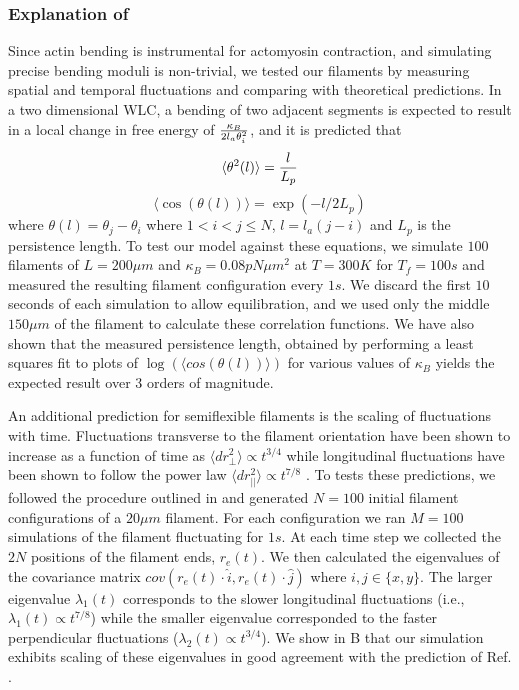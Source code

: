 \documentclass[12pt]{article}
\begin{document}
\subsubsection{Explanation of }
Since actin bending is instrumental for actomyosin contraction, and simulating
precise bending moduli is non-trivial, we tested our filaments by measuring 
spatial and temporal fluctuations and comparing with theoretical predictions.
In a two dimensional WLC, a bending of two adjacent segments is expected to
result in a local change in free energy of ${\kappa_B\over2l_a\theta_i^2}$, and
it is predicted that \cite{frontali1979}
\begin{equation}
  \langle\theta^2(l)\rangle = {l\over L_p}
  \label{eqn:thsq}
\end{equation}
\begin{equation} 
  \langle\cos(\theta(l))\rangle = \exp{(-l/2L_p)}
  \label{eqn:costh}
\end{equation} 
where $\theta(l) = \theta_j - \theta_i$ where $1<i<j\le N$, $l = l_a(j-i)$ and
$L_p$ is the persistence length. To test our model against these equations, we
simulate $100$ filaments of $L=200\mu m$ and $\kappa_B=0.08 pN\mu m^2$ at
$T=300K$ for $T_f = 100s$ and measured the resulting filament configuration
every $1s$. We discard the first $10$ seconds of each simulation to allow
equilibration, and we used only the middle $150 \mu m$ of the filament to
calculate these correlation functions.
We have also shown that the measured persistence length, obtained
by performing a least squares fit to
plots of $\log{(\langle cos(\theta(l))\rangle )} $ for various values of
$\kappa_B$ yields the expected result over $3$ orders of magnitude. 
\par
An additional prediction for semiflexible filaments is the scaling of
fluctuations with time. 
Fluctuations transverse to the filament orientation have been 
shown to increase as a function of time as $\langle dr_{\perp}^2\rangle\propto t^{3/4}$
while longitudinal fluctuations have been shown to follow the power law
$\langle dr_{||}^2\rangle\propto t^{7/8}$ \cite{everaers1999}. To tests these
predictions, we followed the procedure outlined in
\cite{everaers1999} and generated $N = 100$ initial filament configurations of a
$20\mu m$ filament. For each configuration we ran $M = 100$ simulations of the
filament fluctuating for $1s$. At each time step we collected the $2N$ positions
of the filament ends, $r_e(t)$. We then calculated the eigenvalues of the
covariance matrix $cov(r_e(t)\cdot \hat{i},r_e(t)\cdot \hat{j})$ where
$i,j\in\{x,y\}$.
The larger eigenvalue $\lambda_1(t)$ corresponds to the slower longitudinal fluctuations
(i.e., $\lambda_1(t)\propto t^{7/8}$) while the smaller eigenvalue corresponded
to the faster perpendicular fluctuations
($\lambda_2(t)\propto t^{3/4}$). We show  in B that our
simulation exhibits scaling of these eigenvalues in good agreement with the
prediction of Ref. \cite{everaers1999}.
\end{document}
